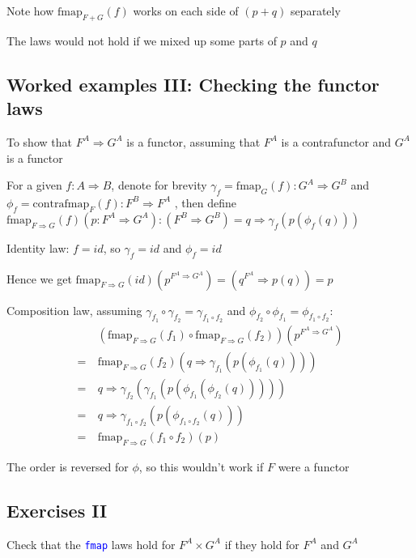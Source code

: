 Note how $\text{fmap}_{F+G}(f)$ works on each side of $\left(p+q\right)$
separately

The laws would not hold if we mixed up some parts of $p$ and $q$


\subsection{Worked examples III: Checking the functor laws}

To show that $F^{A}\Rightarrow G^{A}$ is a functor, assuming that
$F^{A}$ is a contrafunctor and $G^{A}$ is a functor

For a given $f:A\Rightarrow B$, denote for brevity $\gamma_{f}=\text{fmap}_{G}(f):G^{A}\Rightarrow G^{B}$
and $\phi_{f}=\text{contrafmap}_{F}(f):F^{B}\Rightarrow F^{A}$ ,
then define $\text{fmap}_{F\Rightarrow G}(f)(p:F^{A}\Rightarrow G^{A}):\left(F^{B}\Rightarrow G^{B}\right)=q\Rightarrow\gamma_{f}(p(\phi_{f}(q)))$

Identity law: $f=id$, so $\gamma_{f}=id$ and $\phi_{f}=id$

Hence we get $\text{fmap}_{F\Rightarrow G}(id)(p^{F^{A}\Rightarrow G^{A}})=\left(q^{F^{A}}\Rightarrow p(q)\right)=p$

Composition law, assuming $\gamma_{f_{1}}\circ\gamma_{f_{2}}=\gamma_{f_{1}\circ f_{2}}$
and $\phi_{f_{2}}\circ\phi_{f_{1}}=\phi_{f_{1}\circ f_{2}}$: 
\begin{align*}
 & (\text{fmap}_{F\Rightarrow G}(f_{1})\circ\text{fmap}_{F\Rightarrow G}(f_{2}))(p^{F^{A}\Rightarrow G^{A}})\\
=\  & \text{fmap}_{F\Rightarrow G}(f_{2})\left(q\Rightarrow\gamma_{f_{1}}(p(\phi_{f_{1}}(q)))\right)\\
=\  & q\Rightarrow\gamma_{f_{2}}(\gamma_{f_{1}}(p(\phi_{f_{1}}(\phi_{f_{2}}(q)))))\\
=\  & q\Rightarrow\gamma_{f_{1}\circ f_{2}}(p(\phi_{f_{1}\circ f_{2}}(q)))\\
=\  & \text{fmap}_{F\Rightarrow G}(f_{1}\circ f_{2})(p)
\end{align*}

The order is reversed for $\phi$, so this wouldn't work if $F$ were
a functor


\subsection{Exercises II}

Check that the \texttt{\textcolor{blue}{\footnotesize{}fmap}} laws
hold for $F^{A}\times G^{A}$ if they hold for $F^{A}$ and $G^{A}$

